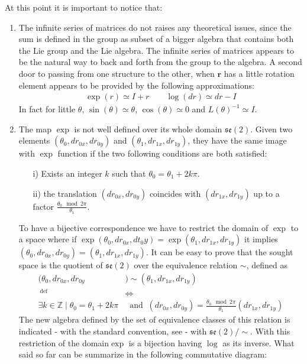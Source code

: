 At this point it is important to notice that: 
\begin{enumerate}
	\item The infinite series of matrices  do not raises any theoretical issues, since the sum is defined in the group as subset of a bigger algebra that contains both the Lie group and the Lie algebra. The infinite series of matrices appears to be the natural way to back and forth from the group to the algebra. A second door to passing from one structure to the other, when $\mathbf{r}$ has a little rotation element appears to be provided by the following approximations:
	\begin{align*}
	\exp(r) \simeq I + r
	\qquad 
	\log(dr) \simeq dr - I
	\end{align*}
	In fact for little $\theta$, $\sin(\theta) \simeq \theta$, $\cos(\theta) \simeq 0 $ and $ L(\theta)^{-1} \simeq I$.
	\item The map $\exp$ is not well defined over its whole domain $\mathfrak{se}(2)$. Given two elements $(\theta_0, dr_{0x}, dr_{0y})$ and $(\theta_1, dr_{1x}, dr_{1y})$, they have the same image with $\exp$ function if the two following conditions are both satisfied:
	\begin{enumerate}
		\item[i)] Exists an integer $k$ such that $\theta_0 = \theta_1 + 2k\pi$.
		\item[ii)] the translation $(dr_{0x}, dr_{0y})$ coincides with $(dr_{1x}, dr_{1y})$ up to a factor $\frac{\theta_0 \mod 2\pi}{\theta_1}$.
	\end{enumerate}
	To have a bijective correspondence we have to restrict the domain of $\exp$ to a space where if $\exp(\theta_0, dr_{0x},d t_0y) = \exp(\theta_1, dr_{1x}, dr_{1y})$ it implies  $(\theta_0, dr_{0x}, dr_{0y}) = (\theta_1, dr_{1x}, dr_{1y})$.
	It can be easy to prove that the sought space is the quotient of $\mathfrak{se}(2)$ over the equivalence relation $\sim$, defined as 
	\begin{align*}
		(\theta_0, dr_{0x}, dr_{0y} & ) \sim (\theta_1, dr_{1x}, dr_{1y})
		\\
		~^{\text{def}}&\iff
		\\
		\exists k\in\mathbb{Z} \mid \theta_0 = \theta_1 + 2k\pi 
		&~\text{ and }~
		(dr_{0x}, dr_{0y}) = \frac{\theta_0 \mod 2\pi}{\theta_1}(dr_{1x}, dr_{1y})
	\end{align*}
	The new algebra defined by the set of equivalence classes of this relation is indicated - with the standard convention, see \cite{artin2011algebra} - with $\mathfrak{se}(2)/\sim$. With this restriction of the domain$\exp$ is a bijection having $\log$ as its inverse.
	What said so far can be summarize in the following commutative diagram:
	

\end{enumerate}

